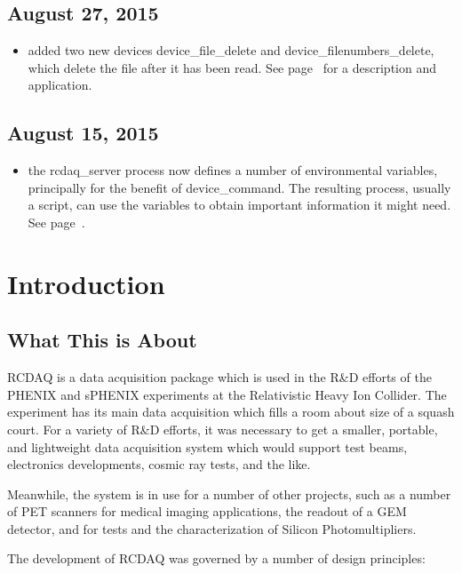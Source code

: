 \documentclass{article}[11pt]
\begin{document}
\subsection{August 27, 2015}
\begin{itemize}
\item  added two new devices device\_file\_delete and device\_filenumbers\_delete, which
  delete the file after it has been read. See page~\pageref{delete} for a description and application.
\end{itemize}

\subsection{August 15, 2015}
\begin{itemize}
\item the rcdaq\_server process now defines a number of environmental
  variables, principally for the benefit of  device\_command. The
  resulting process, usually a script, can use the variables to obtain important
  information it might need. See page~\pageref{environment}.
\end{itemize}

\newpage

\section{Introduction}


\subsection{What This is About}

RCDAQ is a data acquisition package which is used in the R\&D efforts
of the PHENIX and sPHENIX experiments at the Relativistic Heavy Ion
Collider.  The experiment has its main data acquisition which fills a
room about size of a squash court. For a variety of R\&D efforts, it
was necessary to get a smaller, portable, and lightweight data
acquisition system which would support test beams, electronics
developments, cosmic ray tests, and the like.

Meanwhile, the system is in use for a number of other projects, such
as a number of PET scanners for medical imaging applications, the
readout of a GEM detector, and for tests and the characterization of
Silicon Photomultipliers.


The development of RCDAQ was governed by a number of design principles:
\end{document}
